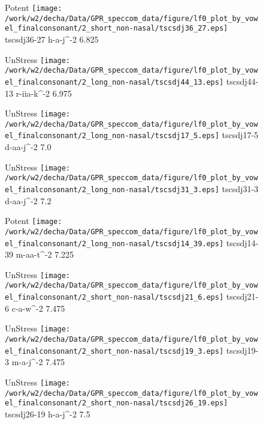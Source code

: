 \documentclass{article}
\begin{document}
\begin{figure}[t]
\begin{minipage}[b]{.24\textwidth}
\colorbox{Apricot}{Potent}
\centering
\texttt{[image: /work/w2/decha/Data/GPR\_speccom\_data/figure/lf0\_plot\_by\_vowel\_finalconsonant/2\_short\_non-nasal/tscsdj36\_27.eps]}
tscsdj36-27 h-a-j\textasciicircum-2 6.825
\end{minipage}
\begin{minipage}[b]{.24\textwidth}
UnStress
\centering
\texttt{[image: /work/w2/decha/Data/GPR\_speccom\_data/figure/lf0\_plot\_by\_vowel\_finalconsonant/2\_long\_non-nasal/tscsdj44\_13.eps]}
tscsdj44-13 r-iia-k\textasciicircum-2 6.975
\end{minipage}
\begin{minipage}[b]{.24\textwidth}
UnStress
\centering
\texttt{[image: /work/w2/decha/Data/GPR\_speccom\_data/figure/lf0\_plot\_by\_vowel\_finalconsonant/2\_long\_non-nasal/tscsdj17\_5.eps]}
tscsdj17-5 d-aa-j\textasciicircum-2 7.0
\end{minipage}
\begin{minipage}[b]{.24\textwidth}
UnStress
\centering
\texttt{[image: /work/w2/decha/Data/GPR\_speccom\_data/figure/lf0\_plot\_by\_vowel\_finalconsonant/2\_long\_non-nasal/tscsdj31\_3.eps]}
tscsdj31-3 d-aa-j\textasciicircum-2 7.2
\end{minipage}
\end{figure}
\clearpage
\begin{figure}[t]
\begin{minipage}[b]{.24\textwidth}
\colorbox{Apricot}{Potent}
\centering
\texttt{[image: /work/w2/decha/Data/GPR\_speccom\_data/figure/lf0\_plot\_by\_vowel\_finalconsonant/2\_long\_non-nasal/tscsdj14\_39.eps]}
tscsdj14-39 m-aa-t\textasciicircum-2 7.225
\end{minipage}
\begin{minipage}[b]{.24\textwidth}
UnStress
\centering
\texttt{[image: /work/w2/decha/Data/GPR\_speccom\_data/figure/lf0\_plot\_by\_vowel\_finalconsonant/2\_short\_non-nasal/tscsdj21\_6.eps]}
tscsdj21-6 c-a-w\textasciicircum-2 7.475
\end{minipage}
\begin{minipage}[b]{.24\textwidth}
UnStress
\centering
\texttt{[image: /work/w2/decha/Data/GPR\_speccom\_data/figure/lf0\_plot\_by\_vowel\_finalconsonant/2\_short\_non-nasal/tscsdj19\_3.eps]}
tscsdj19-3 m-a-j\textasciicircum-2 7.475
\end{minipage}
\begin{minipage}[b]{.24\textwidth}
UnStress
\centering
\texttt{[image: /work/w2/decha/Data/GPR\_speccom\_data/figure/lf0\_plot\_by\_vowel\_finalconsonant/2\_short\_non-nasal/tscsdj26\_19.eps]}
tscsdj26-19 h-a-j\textasciicircum-2 7.5
\end{minipage}
\end{figure}
\end{document}
